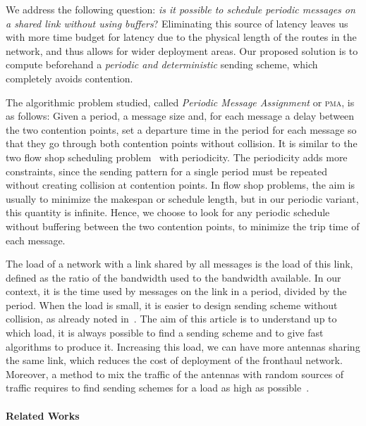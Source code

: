 \documentclass[a4paper,UKenglish,cleveref, autoref, thm-restate]{lipics-v2019}
\newcommand\pma{\textsc{pma}\xspace}
\begin{document}
We address the following question: \emph{is it possible to schedule periodic messages on a shared link without using buffers}? Eliminating this source of latency leaves us with more time budget for latency due to the physical length of the routes in the network, and thus allows for wider deployment areas. Our proposed solution is to compute beforehand a \emph{periodic and deterministic} sending scheme, which completely avoids contention.  

The algorithmic problem studied, called \emph{Periodic Message Assignment} or \pma, is as follows: Given a period, a message size and, for each message a delay between the two contention points, set a departure time in the period for each message so that they go through both contention points without collision. It is similar to the two flow shop scheduling problem~\cite{yu2004minimizing} with periodicity. The periodicity adds more constraints, since the sending pattern for a single period must be repeated without creating collision at contention points. In flow shop problems, the aim is usually to minimize the makespan or schedule length, but in our periodic variant, this quantity is infinite. Hence, we choose to look for any periodic schedule without buffering between the two contention points, to minimize the trip time of each message. 

The load of a network with a link shared by all messages is the load of this link,
defined as the ratio of the bandwidth used to the bandwidth available. In our context,
it is the time used by messages on the link in a period, divided by the period.
When the load is small, it is easier to design sending scheme without collision,
as already noted in~\cite{barth2018deterministic}.
The aim of this article is to understand up to which load, it is always possible to 
find a sending scheme and to give fast algorithms to produce it. Increasing this load, we can have more antennas sharing the same link, which reduces the cost of deployment of the fronthaul network. Moreover, a method to mix the traffic of the antennas with 
random sources of traffic requires to find sending schemes for a load as high as possible~\cite{bartharxiv2018deterministic}. 

\paragraph*{Related Works}
\end{document}
